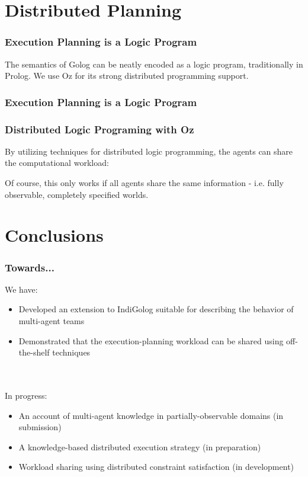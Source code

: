\documentclass[compress]{beamer}
\begin{document}
\section{Distributed Planning}

\begin{frame}
\frametitle{Execution Planning is a Logic Program}
The semantics of Golog can be neatly encoded as a logic program,
traditionally in Prolog.  We use Oz for its strong distributed programming
support.

{\small  }{\small \par}

\end{frame}

\begin{frame}
\frametitle{Execution Planning is a Logic Program}

{\small  }{\small \par}

\end{frame}

\begin{frame}
\frametitle{Distributed Logic Programing with Oz}
By utilizing techniques for distributed logic programming, the agents
can share the computational workload:

\centering {\small  }{\small \par}

Of course, this only works if all agents share the same information - 
i.e. fully observable, completely specified worlds.
\end{frame}

\section{Conclusions}

\begin{frame}
\frametitle{Towards...}
We have:
\begin{itemize}
  \item Developed an extension to IndiGolog suitable for describing the behavior of multi-agent teams
  \item Demonstrated that the execution-planning workload can be shared using off-the-shelf techniques
\end{itemize}
\ \\
\ \\
In progress:
\begin{itemize}
  \item An account of multi-agent knowledge in partially-observable domains (in submission)
  \item A knowledge-based distributed execution strategy (in preparation)
  \item Workload sharing using distributed constraint satisfaction (in development)
\end{itemize}
\end{frame}
\end{document}
